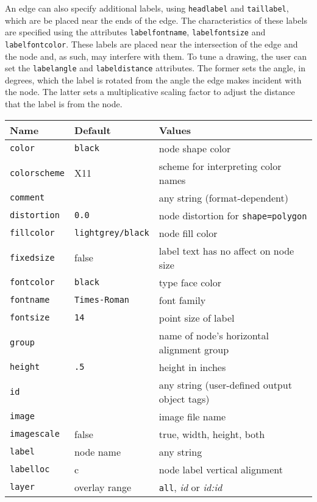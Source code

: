 \documentclass[11pt]{article}
\begin{document}
An edge can also specify additional labels, using {\tt headlabel} and
{\tt taillabel}, which are be placed near the ends of the edge.
The characteristics of these labels are specified using the attributes
{\tt labelfontname}, {\tt labelfontsize} and {\tt labelfontcolor}.
These labels are placed near the intersection of the edge and the node
and, as such, may interfere with them. To tune a drawing, the user can
set the {\tt labelangle} and {\tt labeldistance} attributes.
The former sets the angle, in degrees, which the label is rotated from 
the angle the edge makes incident with the node.
The latter sets a multiplicative scaling factor to adjust the distance
that the label is from the node.

\begin{table}[p]
\begin{tabular}[t]{|l|l|p{3.0in}|} \hline
Name & Default & Values \\ \hline
{\tt color} & {\tt black} & node shape color \\
{\tt colorscheme} & X11 & scheme for interpreting color names \\
{\tt comment} & & any string (format-dependent) \\
{\tt distortion} & {\tt 0.0} & node distortion for {\tt shape=polygon} \\
{\tt fillcolor} & {\tt lightgrey/black} & node fill color \\
{\tt fixedsize} & false & label text has no affect on node size \\
{\tt fontcolor} & {\tt black} & type face color \\
{\tt fontname} & {\tt Times-Roman} & font family \\
{\tt fontsize} & {\tt 14} & point size of label \\
{\tt group} &  & name of node's horizontal alignment group \\
{\tt height} & {\tt .5} & height in inches \\
{\tt id} & & any string (user-defined output object tags) \\
{\tt image} & & image file name \\
{\tt imagescale} & false & true, width, height, both \\
{\tt label} & node name & any string \\
{\tt labelloc} & c & node label vertical alignment \\
{\tt layer} & overlay range & {\tt all}, {\it id} or {\it id:id} \\

\end{tabular}
\end{table}
\end{document}
